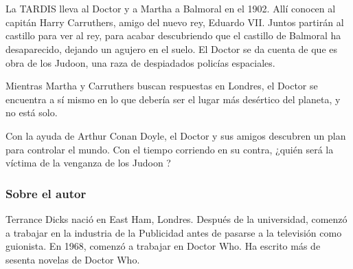 \chapter*{}

La TARDIS lleva al Doctor y a Martha a Balmoral en el 1902. Allí conocen
al capitán Harry Carruthers, amigo del nuevo rey, Eduardo VII. Juntos
partirán al castillo para ver al rey, para acabar descubriendo que el
castillo de Balmoral ha desaparecido, dejando un agujero en el suelo. El
Doctor se da cuenta de que es obra de los Judoon, una raza de
despiadados policías espaciales.

Mientras Martha y Carruthers buscan respuestas en Londres, el Doctor se
encuentra a sí mismo en lo que debería ser el lugar más desértico del
planeta, y no está solo.

Con la ayuda de Arthur Conan Doyle, el Doctor y sus amigos descubren un
plan para controlar el mundo. Con el tiempo corriendo en su contra,
¿quién será la víctima de la venganza de los Judoon ?

\newpage

\subsection*{Sobre el autor}

Terrance Dicks nació en East Ham, Londres. Después de la universidad,
comenzó a trabajar en la industria de la Publicidad antes de pasarse a
la televisión como guionista. En 1968, comenzó a trabajar en Doctor Who.
Ha escrito más de sesenta novelas de Doctor Who.